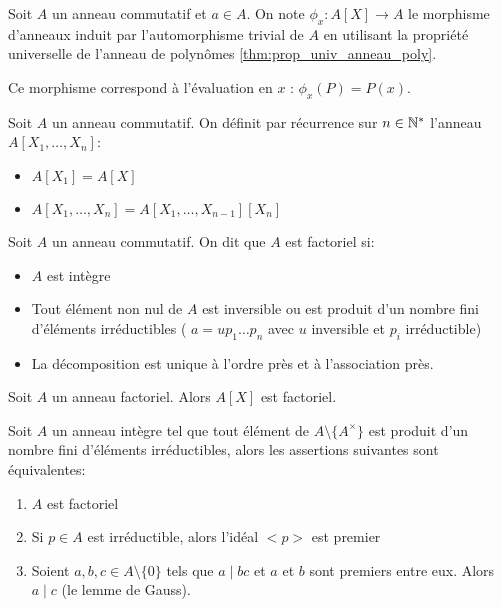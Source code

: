 \begin{definition}[Evaluation]
	Soit $A$ un anneau commutatif et $a \in A$. On note $\phi_x: A[X] \to A$ le morphisme d'anneaux
	induit par l'automorphisme trivial de $A$ en utilisant la propriété universelle de l'anneau de polynômes \ref{thm:prop_univ_anneau_poly}.

	Ce morphisme correspond à l'évaluation en $x$ : $\phi_x(P) = P(x)$.

\end{definition}

\begin{definition}
	Soit $A$ un anneau commutatif. On définit par récurrence sur $n \in \mathbb{N}^*$ l'anneau $A[X_1, \dots, X_n]$:
	\begin{itemize}
		\item $A[X_1] = A[X]$
		\item $A[X_1, \dots, X_n] = A[X_1, \dots, X_{n-1}][X_n]$
	\end{itemize}
\end{definition}


\begin{definition}
	Soit $A$ un anneau commutatif. On dit que $A$ est factoriel si:
	\begin{itemize}
		\item $A$ est intègre
		\item Tout élément non nul de $A$ est inversible ou est produit d'un nombre fini
		      d'éléments irréductibles ( $a = u p_1 \dots p_n$ avec $u$ inversible et $p_i$ irréductible)
		\item La décomposition est unique à l'ordre près et à l'association près.
	\end{itemize}
\end{definition}

\begin{prop}[Admis]
	Soit $A$ un anneau factoriel. Alors $A[X]$ est factoriel.
\end{prop}


\begin{prop}
	Soit $A$ un anneau intègre tel que tout élément de $A\setminus\{A^{\times}\}$ est produit d'un nombre fini d'éléments irréductibles, alors les assertions suivantes sont équivalentes:
	\begin{enumerate}
		\item $A$ est factoriel
		\item Si $p \in A$ est irréductible, alors l'idéal $<p>$ est premier
		\item Soient $a,b,c \in A\setminus\{0\}$ tels que $a \mid bc$ et $a$ et $b$ sont premiers entre eux. Alors $a \mid c$ (le lemme de Gauss).
	\end{enumerate}
\end{prop}

